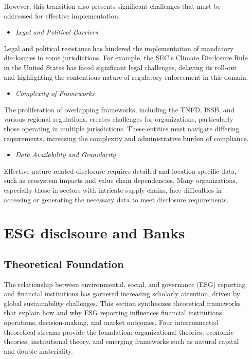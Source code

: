 \documentclass[
  authoryear]{elsarticle}
\providecommand{\tightlist}{%
  \setlength{\itemsep}{0pt}\setlength{\parskip}{0pt}}\usepackage{longtable,booktabs,array}
\begin{document}
However, this transition also presents significant challenges that must
be addressed for effective implementation.

\begin{itemize}
\tightlist
\item
  \emph{Legal and Political Barriers}
\end{itemize}

Legal and political resistance has hindered the implementation of
mandatory disclosures in some jurisdictions. For example, the SEC's
Climate Disclosure Rule in the United States has faced significant legal
challenges, delaying its roll-out and highlighting the contentious
nature of regulatory enforcement in this domain.

\begin{itemize}
\tightlist
\item
  \emph{Complexity of Frameworks}
\end{itemize}

The proliferation of overlapping frameworks, including the TNFD, ISSB,
and various regional regulations, creates challenges for organizations,
particularly those operating in multiple jurisdictions. These entities
must navigate differing requirements, increasing the complexity and
administrative burden of compliance.

\begin{itemize}
\tightlist
\item
  \emph{Data Availability and Granularity}
\end{itemize}

Effective nature-related disclosure requires detailed and
location-specific data, such as ecosystem impacts and value chain
dependencies. Many organizations, especially those in sectors with
intricate supply chains, face difficulties in accessing or generating
the necessary data to meet disclosure requirements.

\section{ESG disclsoure and Banks}\label{esg-disclsoure-and-banks}

\subsection{Theoretical Foundation}\label{theoretical-foundation}

The relationship between environmental, social, and governance (ESG)
reporting and financial institutions has garnered increasing scholarly
attention, driven by global sustainability challenges. This section
synthesizes theoretical frameworks that explain how and why ESG
reporting influences financial institutions' operations,
decision-making, and market outcomes. Four interconnected theoretical
streams provide the foundation: organizational theories, economic
theories, institutional theory, and emerging frameworks such as natural
capital and double materiality.
\end{document}
